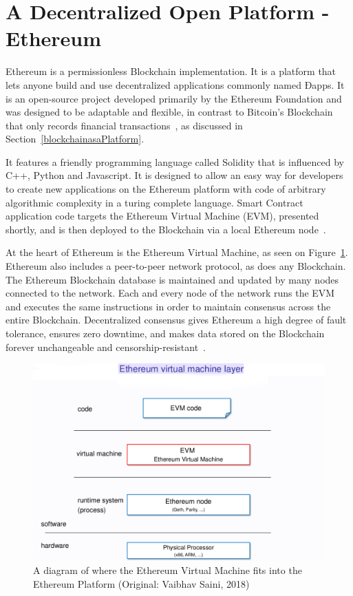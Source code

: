 \section{A Decentralized Open Platform - Ethereum}
\label{ethereumPlatform}

Ethereum is a permissionless Blockchain implementation. It is a platform that
lets anyone build and use decentralized applications commonly named Ðapps. It
is an open-source project developed primarily by the Ethereum Foundation and
was designed to be adaptable and flexible, in contrast to Bitcoin's Blockchain
that only records financial transactions~\cite{EthereumDocs2018}, as discussed
in Section~\ref{blockchainasaPlatform}.

It features a friendly programming language called Solidity that is influenced
by C++, Python and Javascript. It is designed to allow an easy way for
developers to create new applications on the Ethereum platform with code of
arbitrary algorithmic complexity in a turing complete language. Smart Contract
application code targets the Ethereum Virtual Machine (EVM), presented shortly,
and is then deployed to the Blockchain via a local Ethereum
node~\cite{Wood2017,Barclay2017}.

At the heart of Ethereum is the Ethereum Virtual Machine, as seen on
Figure~\ref{fig:evm}. Ethereum also includes a peer-to-peer network protocol,
as does any Blockchain. The Ethereum Blockchain database is maintained and
updated by many nodes connected to the network. Each and every node of the
network runs the EVM and executes the same instructions in order to maintain
consensus across the entire Blockchain. Decentralized consensus gives Ethereum
a high degree of fault tolerance, ensures zero downtime, and makes data stored
on the Blockchain forever unchangeable and
censorship-resistant~\cite{EthereumDocs2018}.

\begin{figure}[h]
  \centering
  \includegraphics[width=1\linewidth]{imgs/ethereumVirtualMachine.png}
  \caption{\label{fig:evm} A diagram of where the Ethereum Virtual Machine fits
  into the Ethereum Platform (Original: Vaibhav Saini, 2018)}
\end{figure}

